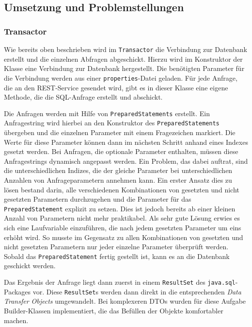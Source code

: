 \subsection{Umsetzung und Problemstellungen}
\label{sec:restUmsetzungen}
\subsubsection{Transactor}
Wie bereits oben beschrieben wird im \texttt{Transactor} die Verbindung zur Datenbank erstellt und die einzelnen Abfragen abgeschickt. Hierzu wird im Konstruktor der Klasse eine Verbindung zur Datenbank hergestellt. Die benötigten Parameter für die Verbindung werden aus einer \texttt{properties}-Datei geladen. Für jede Anfrage, die an den REST-Service gesendet wird, gibt es in dieser Klasse eine eigene Methode, die die SQL-Anfrage erstellt und abschickt. 

Die Anfragen werden mit Hilfe von \texttt{PreparedStatements} erstellt. Ein Anfragestring wird hierbei an den Konstruktor des \texttt{PreparedStatements} übergeben und die einzelnen Parameter mit einem Fragezeichen markiert. Die Werte für diese Parameter können dann im nächsten Schritt anhand eines Indexes gesetzt werden. Bei Anfragen, die optionale Parameter enthalten, müssen diese Anfragestrings dynamisch angepasst werden. Ein Problem, das dabei auftrat, sind die unterschiedlichen Indizes, die der gleiche Parameter bei unterschiedlichen Anzahlen von Anfrageparametern annehmen kann. Ein erster Ansatz dies zu lösen bestand darin, alle verschiedenen Kombinationen von gesetzten und nicht gesetzten Parametern durchzugehen und die Parameter für das \texttt{PreparedStatement} explizit zu setzen. Dies ist jedoch bereits ab einer kleinen Anzahl von Parametern nicht mehr praktikabel. Als sehr gute Lösung erwies es sich eine Laufvariable einzuführen, die nach jedem gesetzten Parameter um eins erhöht wird. So musste im Gegensatz zu allen Kombinationen von gesetzten und nicht gesetzten Parametern nur jeder einzelne Parameter überprüft werden. Sobald das \texttt{PreparedStatement} fertig gestellt ist, kann es an die Datenbank geschickt werden. 

Das Ergebnis der Anfrage liegt dann zuerst in einem \texttt{ResultSet} des \texttt{java.sql}-Packages vor. Diese \texttt{ResultSet}s werden dann direkt in die entsprechenden \textit{Data Transfer Objects} umgewandelt. Bei komplexeren DTOs wurden für diese Aufgabe Builder-Klassen implementiert, die das Befüllen der Objekte komfortabler machen.

